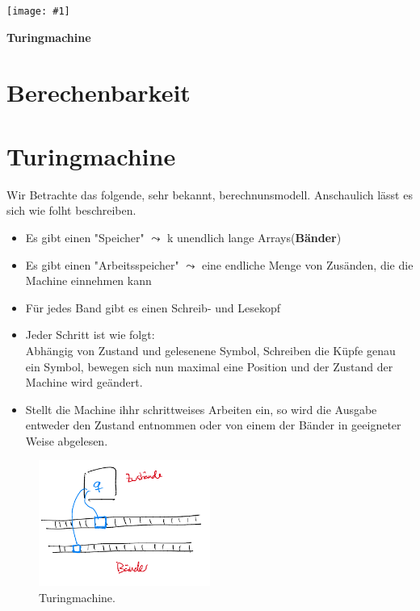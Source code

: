 \documentclass[a4paper,11pt]{article}
\newcommand{\coversection}[2]{
  \newpage
  \thispagestyle{empty}
  \begin{center}
    \vspace*{\fill}
    \texttt{[image: \#1]}
    \vspace*{0.5cm} %
    \par
    \Large\textbf{#2}
    \par\vspace{\fill}
  \end{center}
  \newpage
}
\begin{document}
\coversection{turing.png}{Turingmachine}
\section*{Berechenbarkeit}
\section{Turingmachine} 
\begin{sloppypar}
  Wir Betrachte das folgende, sehr bekannt, berechnunsmodell. Anschaulich lässt es sich wie folht beschreiben.
\end{sloppypar} 
\begin{itemize}
  \renewcommand\labelitemi{-}
  \item Es gibt einen "Speicher" $\leadsto $ k unendlich lange Arrays(\textbf{Bänder})
  \item Es gibt einen "Arbeitsspeicher" $\leadsto$ eine endliche Menge von Zusänden, die die Machine einnehmen kann
  \item Für jedes Band gibt es einen Schreib- und Lesekopf 
  \item Jeder Schritt ist wie folgt:\\ Abhängig von Zustand und gelesenene Symbol, Schreiben die Küpfe genau ein Symbol, bewegen sich nun maximal eine Position und der Zustand der Machine wird geändert.
  \item Stellt die Machine ihhr schrittweises Arbeiten ein, so wird die Ausgabe entweder den Zustand entnommen oder von einem der Bänder in geeigneter Weise abgelesen.
\end{itemize}

\begin{figure}[htp]
  \centering
  \includegraphics[width=0.5\textwidth]{turing_sym.png}
  \caption{Turingmachine.}
  \label{fig:tm}
\end{figure}
\end{document}
